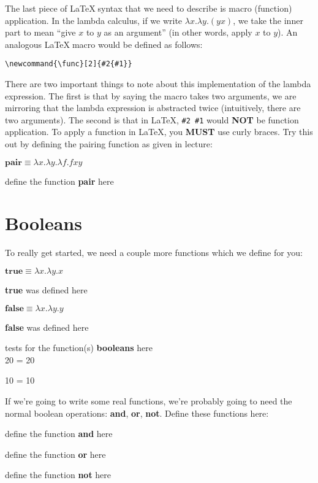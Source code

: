 \documentclass{article}
\newcommand{\op}[1]{\textbf{#1}}
\newcommand{\lcalc}[1]{\begin{center}\ensuremath{#1}\end{center}}
\newcommand{\begintodo}[1]{\begin{center}define the function \op{#1} here\end{center}}
\newcommand{\begindone}[1]{\begin{center}\op{#1} was defined here\end{center}}
\newcommand{\finishtodo}[1]{}
\newcommand{\finishdone}[1]{}
\newcommand{\test}[2]{#1 = #2\par}
\newcommand{\begintests}[1]{\begin{center}tests for the function(s) \op{#1} here\\}
\newcommand{\finishtests}[1]{\end{center}}
\begin{document}
The last piece of \LaTeX$\;$syntax that we need to describe is macro (function) application.  In the lambda calculus, if we write $\lambda x. \lambda y. (y x)$, we take
the inner part to mean ``give $x$ to $y$ as an argument'' (in other words, apply $x$ to $y$).  An analogous \LaTeX$\;$macro would be defined as follows:
\begin{center}
    \verb+\newcommand{\func}[2]{#2{#1}}+
\end{center}
There are two important things to note about this implementation of the lambda expression.  The first is that by saying the macro takes two arguments, we are mirroring that
the lambda expression is abstracted twice (intuitively, there are two arguments).  The second is that in \LaTeX, \verb+#2 #1+ would \textbf{NOT} be function application.
To apply a function in \LaTeX, you \textbf{MUST} use curly braces.  Try this out by defining the pairing function as given in lecture:

\lcalc{\op{pair} \equiv \lambda x. \lambda y. \lambda f. f x y}

\begintodo{pair}
\newcommand{\pair}[3]{#3{#1}{#2}}
\finishtodo{pair}

\section{Booleans}
To really get started, we need a couple more functions which we define for you:

\lcalc{\op{true} \equiv \lambda x . \lambda y. x}
\begindone{true}
\newcommand{\true}[2]{#1}
\finishdone{true}

\lcalc{\op{false} \equiv \lambda x . \lambda y. y}
\begindone{false}
\newcommand{\false}[2]{#2}
\finishdone{false}

\begintests{booleans}
\test{\false{10}{20}}{20}
\test{\true{10}{20}}{10}
\finishtests{booleans}

If we're going to write some real functions, we're probably going to need the normal 
boolean operations: \op{and}, \op{or}, \op{not}.  Define these functions here:

\begintodo{and}
\newcommand{\cAnd}[2]{#1{#2}{#1}}
\finishtodo{and}

\begintodo{or}
\newcommand{\cOr}[2]{#1{#1}{#2}}
\finishtodo{or}

\begintodo{not}
\newcommand{\cNot}[3]{#1{#3}{#2}}
\finishtodo{not}
\end{document}
